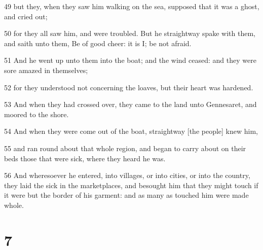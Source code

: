 \par 49 but they, when they saw him walking on the sea, supposed that it was a ghost, and cried out;
\par 50 for they all saw him, and were troubled. But he straightway spake with them, and saith unto them, Be of good cheer: it is I; be not afraid.
\par 51 And he went up unto them into the boat; and the wind ceased: and they were sore amazed in themselves;
\par 52 for they understood not concerning the loaves, but their heart was hardened.
\par 53 And when they had crossed over, they came to the land unto Gennesaret, and moored to the shore.
\par 54 And when they were come out of the boat, straightway [the people] knew him,
\par 55 and ran round about that whole region, and began to carry about on their beds those that were sick, where they heard he was.
\par 56 And wheresoever he entered, into villages, or into cities, or into the country, they laid the sick in the marketplaces, and besought him that they might touch if it were but the border of his garment: and as many as touched him were made whole.

\chapter{7}

